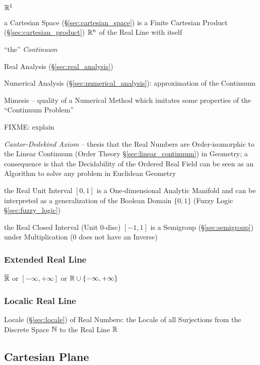 $\mathbb{R}^1$

a Cartesian Space (\S\ref{sec:cartesian_space}) is a Finite Cartesian Product
(\S\ref{sec:cartesian_product}) $\mathbb{R}^n$ of the Real Line with itself

``the'' \emph{Continuum}

\fist Real Analysis (\S\ref{sec:real_analysis})

\fist Numerical Analysis (\S\ref{sec:numerical_analysis}): approximation of the
Continuum

Mimesis -- quality of a Numerical Method which imitates some properties of the
``Continuum Problem''

FIXME: explain

\emph{Cantor-Dedekind Axiom} -- thesis that the Real Numbers are
Order-isomorphic to the Linear Continuum (Order Theory
\S\ref{sec:linear_continuum}) in Geometry; a consequence is that the
Decidability of the Ordered Real Field can be seen as an Algorithm to solve any
problem in Euclidean Geometry

the Real Unit Interval $[0,1]$ is a One-dimensional Analytic Manifold and can be
interpreted as a generalization of the Boolean Domain $\{0, 1\}$ (Fuzzy Logic
\S\ref{sec:fuzzy_logic})

the Real Closed Interval (Unit 0-disc) $[-1,1]$ is a Semigroup
(\S\ref{sec:semigroup}) under Multiplication ($0$ does not have an Inverse)



\subsubsection{Extended Real Line}\label{sec:extended_real_line}

$\overline{\mathbb{R}}$ or $[-\infty, +\infty]$ or $\mathbb{R} \cup \{
-\infty, +\infty\}$




\subsubsection{Localic Real Line}\label{sec:localic_real_line}

Locale (\S\ref{sec:locale}) of Real Numbers: the Locale of all Surjections from
the Discrete Space $\mathbb{N}$ to the Real Line $\mathbb{R}$



\subsection{Cartesian Plane}\label{sec:cartesian_plane}

